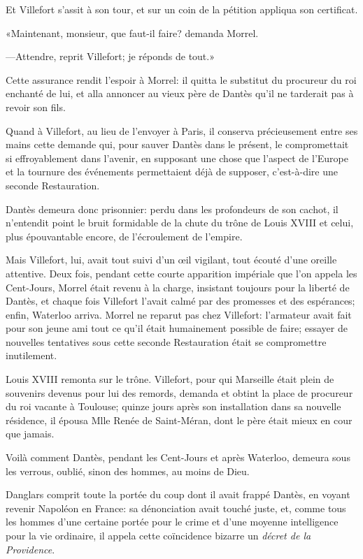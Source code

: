 Et Villefort s'assit à son tour, et sur un coin de la pétition appliqua son certificat.

«Maintenant, monsieur, que faut-il faire? demanda Morrel.

—Attendre, reprit Villefort; je réponds de tout.»

Cette assurance rendit l'espoir à Morrel: il quitta le substitut du procureur du roi enchanté de lui, et alla annoncer au vieux père de Dantès qu'il ne tarderait pas à revoir son fils.

Quand à Villefort, au lieu de l'envoyer à Paris, il conserva précieusement entre ses mains cette demande qui, pour sauver Dantès dans le présent, le compromettait si effroyablement dans l'avenir, en supposant une chose que l'aspect de l'Europe et la tournure des événements permettaient déjà de supposer, c'est-à-dire une seconde Restauration.

Dantès demeura donc prisonnier: perdu dans les profondeurs de son cachot, il n'entendit point le bruit formidable de la chute du trône de Louis XVIII et celui, plus épouvantable encore, de l'écroulement de l'empire.

Mais Villefort, lui, avait tout suivi d'un œil vigilant, tout écouté d'une oreille attentive. Deux fois, pendant cette courte apparition impériale que l'on appela les Cent-Jours, Morrel était revenu à la charge, insistant toujours pour la liberté de Dantès, et chaque fois Villefort l'avait calmé par des promesses et des espérances; enfin, Waterloo arriva. Morrel ne reparut pas chez Villefort: l'armateur avait fait pour son jeune ami tout ce qu'il était humainement possible de faire; essayer de nouvelles tentatives sous cette seconde Restauration était se compromettre inutilement.

Louis XVIII remonta sur le trône. Villefort, pour qui Marseille était plein de souvenirs devenus pour lui des remords, demanda et obtint la place de procureur du roi vacante à Toulouse; quinze jours après son installation dans sa nouvelle résidence, il épousa Mlle Renée de Saint-Méran, dont le père était mieux en cour que jamais.

Voilà comment Dantès, pendant les Cent-Jours et après Waterloo, demeura sous les verrous, oublié, sinon des hommes, au moins de Dieu.

Danglars comprit toute la portée du coup dont il avait frappé Dantès, en voyant revenir Napoléon en France: sa dénonciation avait touché juste, et, comme tous les hommes d'une certaine portée pour le crime et d'une moyenne intelligence pour la vie ordinaire, il appela cette coïncidence bizarre un \textit{décret de la Providence}.


